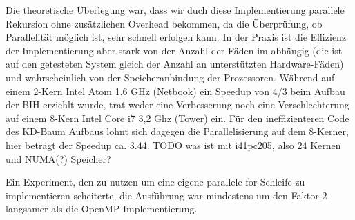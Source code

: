 Die theoretische Überlegung war, dass wir duch diese Implementierung parallele Rekursion ohne zusätzlichen Overhead bekommen, da die Überprüfung, ob Parallelität möglich ist, sehr schnell erfolgen kann. In der Praxis ist die Effizienz der Implementierung aber stark von der Anzahl der Fäden im  abhängig (die ist auf den getesteten System gleich der Anzahl an unterstützten Hardware-Fäden) und wahrscheinlich von der Speicheranbindung der Prozessoren. Während auf einem 2-Kern Intel Atom 1,6 GHz (Netbook) ein Speedup von 4/3 beim Aufbau der BIH erziehlt wurde, trat weder eine Verbesserung noch eine Verschlechterung auf einem 8-Kern Intel Core i7 3,2 Ghz (Tower) ein. Für den ineffizienteren Code des KD-Baum Aufbaus lohnt sich dagegen die Parallelisierung auf dem 8-Kerner, hier beträgt der Speedup ca. 3.44. TODO was ist mit i41pc205, also 24 Kernen und NUMA(?) Speicher?

Ein Experiment, den  zu nutzen um eine eigene parallele for-Schleife zu implementieren scheiterte, die Ausführung war mindestens um den Faktor 2 langsamer als die OpenMP Implementierung.
